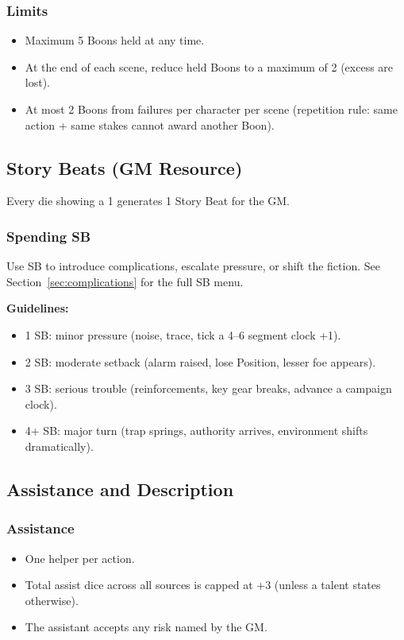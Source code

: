 \subsubsection{Limits}
\begin{itemize}
  \item Maximum 5 Boons held at any time.
  \item At the end of each scene, reduce held Boons to a maximum of 2 (excess are lost).
  \item At most 2 Boons from failures per character per scene (repetition rule: same action + same stakes cannot award another Boon).
\end{itemize}

\subsection{Story Beats (GM Resource)}

Every die showing a 1 generates 1 Story Beat for the GM.

\subsubsection{Spending SB}
Use SB to introduce complications, escalate pressure, or shift the fiction. See Section~\ref{sec:complications} for the full SB menu.

\textbf{Guidelines:}
\begin{itemize}
  \item 1 SB: minor pressure (noise, trace, tick a 4–6 segment clock +1).
  \item 2 SB: moderate setback (alarm raised, lose Position, lesser foe appears).
  \item 3 SB: serious trouble (reinforcements, key gear breaks, advance a campaign clock).
  \item 4+ SB: major turn (trap springs, authority arrives, environment shifts dramatically).
\end{itemize}

\subsection{Assistance and Description}

\subsubsection{Assistance}
\begin{itemize}
  \item One helper per action.
  \item Total assist dice across all sources is capped at +3 (unless a talent states otherwise).
  \item The assistant accepts any risk named by the GM.
\end{itemize}

